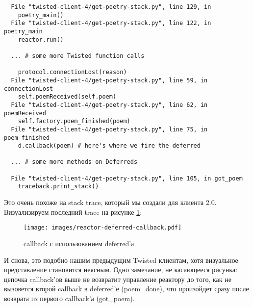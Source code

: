  \begin{verbatim}
  File "twisted-client-4/get-poetry-stack.py", line 129, in
    poetry_main()
  File "twisted-client-4/get-poetry-stack.py", line 122, in poetry_main
    reactor.run()

  ... # some more Twisted function calls

    protocol.connectionLost(reason)
  File "twisted-client-4/get-poetry-stack.py", line 59, in connectionLost
    self.poemReceived(self.poem)
  File "twisted-client-4/get-poetry-stack.py", line 62, in poemReceived
    self.factory.poem_finished(poem)
  File "twisted-client-4/get-poetry-stack.py", line 75, in poem_finished
    d.callback(poem) # here's where we fire the deferred

  ... # some more methods on Deferreds

  File "twisted-client-4/get-poetry-stack.py", line 105, in got_poem
    traceback.print_stack()
\end{verbatim} 

Это очень похоже на stack trace, который мы создали для клиента 2.0. 
Визуализируем последний trace на рисунке \ref{fig:reactor-deferred-callback}:

\begin{figure}[h]
\begin{center}
    \texttt{[image: images/reactor-deferred-callback.pdf]}
    \caption{callback с использованием deferred'а\label{fig:reactor-deferred-callback}}
\end{center}
\end{figure}

И снова, это подобно нашим предыдущим Twisted клиентам, 
хотя визуальное представление становится неясным. 
Одно замечание, не касающееся рисунка: цепочка callback'ов 
выше не возвратит управление реактору до того, как не 
вызовется второй callback в deferred'е (poem\_done), 
что произойдет сразу после возврата из первого callback'а (got\_poem). 


